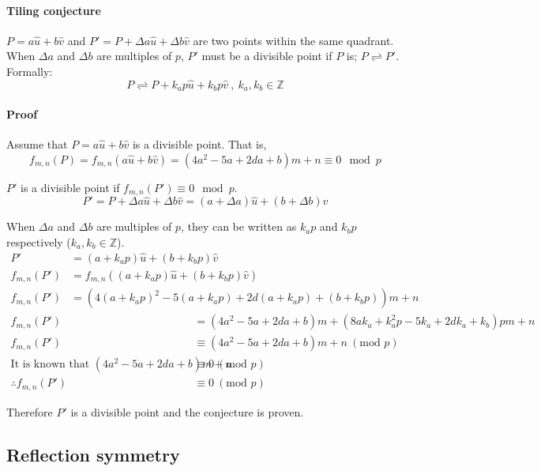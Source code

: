 \documentclass{article}
\begin{document}
\paragraph{Tiling conjecture} \(P = a\hat{u}+b\hat{v}\) and \(P' = P + \Delta a\hat{u} + \Delta b\hat{v}\) are two points within the same quadrant. When \(\Delta a\) and \(\Delta b\) are multiples of \(p\), \(P'\) must be a divisible point if \(P\) is; \(P \rightleftharpoons P'\). Formally:
	\[P \rightleftharpoons P + k_ap\hat{u} + k_bp\hat{v}\ ,\ k_a,k_b \in \mathbb{Z}\]

\paragraph{Proof} Assume that \(P = a\hat{u}+b\hat{v}\) is a divisible point. That is,
	\[f_{m,n}(P) = f_{m,n}(a\hat{u}+b\hat{v}) = (4a^2 - 5a + 2da + b)m + n \equiv 0 \mod p\]
	
\(P'\) is a divisible point if \(f_{m,n}(P') \equiv 0 \mod p\).
	\[P' = P + \Delta a\hat{u} + \Delta b\hat{v} = (a + \Delta a)\hat{u} + (b + \Delta b)\hat{v}\]
	
When \(\Delta a\) and \(\Delta b\) are multiples of \(p\), they can be written as \(k_ap\) and \(k_bp\) respectively (\(k_a,k_b \in \mathbb{Z}\)).
\begin{align}
	\nonumber P' &= (a + k_ap)\hat{u} + (b + k_bp)\hat{v} \\
	\nonumber f_{m,n}(P') &= f_{m,n}((a + k_ap)\hat{u} + (b + k_bp)\hat{v}) \\
	\nonumber f_{m,n}(P') &= (4(a + k_ap)^2 - 5(a + k_ap) + 2d(a + k_ap) + (b + k_bp))m + n
\end{align}
\begin{align}
	\nonumber f_{m,n}(P') &= (4a^2 - 5a + 2da + b)m + (8ak_a + k_a^2p - 5k_a + 2dk_a + k_b)pm + n \\
	\nonumber f_{m,n}(P') &\equiv (4a^2 - 5a + 2da + b)m + n\ (\text{mod } p) \\
	\nonumber \text{It is known that }(4a^2 - 5a + 2da + b)m + n &\equiv 0\ (\text{mod } p) \\
	\nonumber \therefore f_{m,n}(P') &\equiv 0\ (\text{mod } p)
\end{align}

Therefore \(P'\) is a divisible point and the conjecture is proven.


\subsection{Reflection symmetry}
\end{document}
